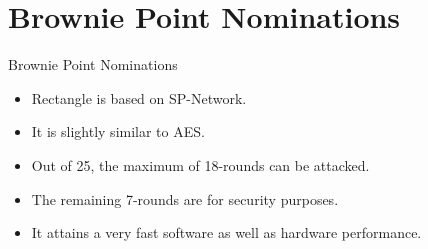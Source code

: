 \section{Brownie Point Nominations}

\begin{frame}{Brownie Point Nominations}
\begin{block}{}
\begin{itemize}
    \item Rectangle is based on SP-Network.
    \item It is slightly similar to AES.
    \item Out of 25, the maximum of 18-rounds can be attacked.
    \item The remaining 7-rounds are for security purposes.
    \item It attains a very fast software as well as hardware performance.
\end{itemize}
    
\end{block}
\end{frame}

